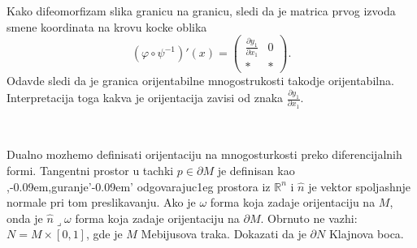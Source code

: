 \documentclass[a4paper,12pt]{article}
\newcommand{\RR}{\mathbb{R}}
\def\zn{,\kern-0.09em,} %
\def\zng{'\kern-0.09em' } %
\begin{document}
\begin{nap}
	Kako difeomorfizam slika granicu na granicu, sledi da je matrica prvog izvoda smene koordinata na krovu kocke oblika
	\[ (\varphi \circ \psi^{-1})'(x) = \left(\begin{matrix}
		\frac{\partial y_1}{\partial x_1}  & 0 \\
		* & *
	\end{matrix}\right)  .\] 
	Odavde sledi da je granica orijentabilne mnogostrukosti takodje orijentabilna. Inter\-pretacija toga kakva je orijentacija zavisi od znaka
	$\frac{\partial y_1}{\partial x_1}$.
\end{nap}\\

\begin{nap}
	Dualno mozhemo definisati orijentaciju na mnogosturkosti preko dife\-rencijalnih formi. Tangentni prostor u tachki
	$p \in \partial M$ je definisan kao \zn guranje\zng odgo\-varajuc1eg prostora iz $\RR^n$ i $\hat{n}$ je vektor spoljashnje
	normale pri tom preslikavanju. Ako je $\omega$ forma koja zadaje orijentaciju na $M$, onda je $\hat{n} \lrcorner \omega$ forma
	koja zadaje orijentaciju na $\partial M$. Obrnuto ne vazhi: $ N = M\times [0, 1]$, gde je $M$ Mebijusova traka. Dokazati da je 
	$\partial N$ Klajnova boca.
\end{nap}\\
\end{document}
